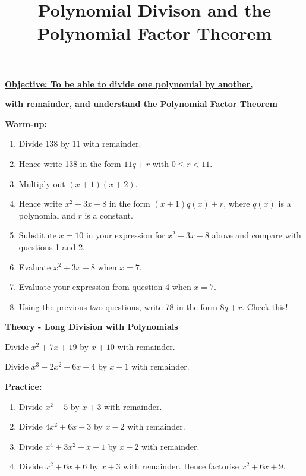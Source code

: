 \documentclass{article}
\begin{document}
\title{Polynomial Divison and the Polynomial Factor Theorem}
\date{}

\maketitle

\Large

{\bf \underline{Objective: To be able to divide one polynomial by another,}}

{\bf \underline{with remainder, and understand the Polynomial Factor Theorem}}

\vspace{5mm}

{\bf Warm-up:}

\vspace{5mm}

\begin{enumerate}
\item Divide 138 by 11 with remainder.
\item Hence write 138 in the form $11q+r$ with $0\leq r<11$.
\item Multiply out $(x+1)(x+2)$.
\item Hence write $x^2+3x+8$ in the form $(x+1)q(x)+r$, where $q(x)$ is a polynomial and $r$ is a constant.
\item Substitute $x=10$ in your expression for $x^2+3x+8$ above and compare with questions 1 and 2.
\item Evaluate $x^2+3x+8$ when $x=7$.
\item Evaluate your expression from question 4 when $x=7$.
\item Using the previous two questions, write 78 in the form $8q+r$. Check this!
\end{enumerate}

\clearpage


{\bf Theory - Long Division with Polynomials}

Divide $x^2+7x+19$ by $x+10$ with remainder.

\vfill

Divide $x^3-2x^2+6x-4$ by $x-1$ with remainder.

\vfill
\clearpage


{\bf Practice:}

\vspace{5mm}

\begin{enumerate}
\item Divide $x^2-5$ by $x+3$ with remainder.
\item Divide $4x^2+6x-3$ by $x-2$ with remainder.
\item Divide $x^4+3x^2-x+1$ by $x-2$ with remainder.
\item Divide $x^2+6x + 6$ by $x+3$ with remainder. Hence factorise $x^2+6x+9$.
\end{enumerate}
\end{document}
